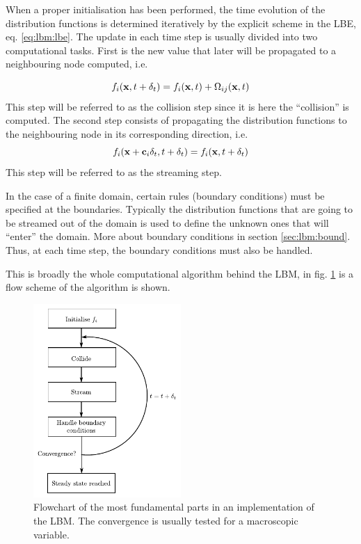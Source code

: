 When a proper initialisation has been performed, the time evolution of
the distribution functions is determined iteratively by the explicit
scheme in the LBE, eq. \eqref{eq:lbm:lbe}. The update in each time
step is usually divided into two computational tasks. First is the new
value that later will be propagated to a neighbouring node computed,
i.e.

\begin{equation}
f_i(\mathbf{x}, t + \delta_t) = f_i(\mathbf{x}, t) + \Omega_{ij}(\mathbf{x}, t)
\end{equation}
This step will be referred to as the collision step since it is here
the ``collision'' is computed. The second step consists of propagating
the distribution functions to the neighbouring node in its
corresponding direction, i.e.
\begin{equation}
f_i(\mathbf{x} + \mathbf{c}_i\delta_t, t + \delta_t) = f_i(\mathbf{x}, t + \delta_t)
\end{equation}
This step will be referred to as the streaming step.

In the case of a finite domain, certain rules (boundary conditions)
must be specified at the boundaries. Typically the distribution
functions that are going to be streamed out of the domain is used to
define the unknown ones that will ``enter'' the domain. More about
boundary conditions in section \ref{sec:lbm:bound}. Thus, at each time
step, the boundary conditions must also be handled. 

This is broadly the whole computational algorithm behind the LBM, in
fig. \ref{fig:lbm:algo} is a flow scheme of the algorithm is shown.

\begin{figure}
\begin{center}
\includegraphics[width=0.5\textwidth]{fig/algorithm.pdf}
\end{center}
\caption{Flowchart of the most fundamental parts in an implementation
  of the LBM. The convergence is usually tested for a macroscopic
  variable.}
\label{fig:lbm:algo}
\end{figure}
